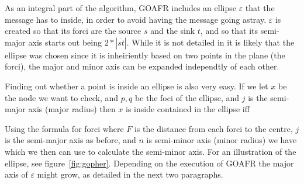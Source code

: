 As an integral part of the algorithm, GOAFR includes an ellipse $\varepsilon$ that the message has to inside, in order to avoid having the message going astray. $\varepsilon$ is created so that its forci are the source $s$ and the sink $t$, and so that its semi-major axis starts out being $2 * |\overline{st}|$. While it is not detailed in \cite{gopher} it is likely that the ellipse was chosen since it is inheiriently based on two points in the plane (the forci), the major and minor axis can be expanded independtly of each other. 

Finding out whether a point is inside an ellipse is also very easy. If we let $x$ be the node we want to check, and $p, q$ be the foci of the ellipse, and $j$ is the semi-major axis (major radius) then $x$ is inside contained in the ellipse iff 

Using the formula for forci
where $F$ is the distance from each forci to the centre, $j$ is the semi-major axis as before, and $n$ is semi-minor axis (minor radius) we have
which we then can use to calculate the semi-minor axis. For an illustration of the ellipse, see figure~\ref{fig:gopher}. Depending on the execution of GOAFR the major axis of $\varepsilon$ might grow, as detailed in the next two paragraphs. 

